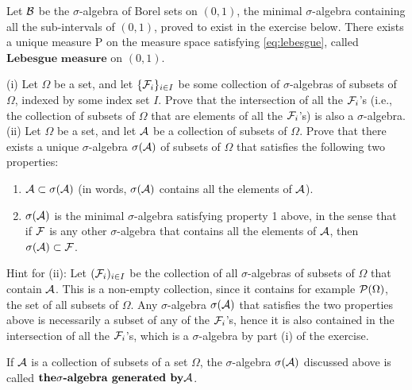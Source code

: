 \begin{thm}
\label{thm-lebesgue}
Let ${\cal B}$ be the $\sigma$-algebra of Borel sets
on $(0,1)$, the minimal $\sigma$-algebra containing
all the sub-intervals of $(0,1)$, proved to exist in
the exercise below. There exists a unique measure
$\mathrm{P}$ on the measure space satisfying
\eqref{eq:lebesgue}, called $\textbf{Lebesgue measure}$
on $(0,1)$.
\end{thm}

\begin{xexercise}
(i) Let $\Omega$ be a set, and let
$\{{\cal F}_i\}_{i\in I}$ be some collection of
$\sigma$-algebras of subsets of $\Omega$, indexed by
some index set $I$. Prove that the intersection of
all the ${\cal F}_i$'s (i.e., the collection of
subsets of $\Omega$ that are elements of all the
${\cal F}_i$'s) is also a $\sigma$-algebra. \\ (ii)
Let $\Omega$ be a set, and let ${\cal A}$ be a
collection of subsets of $\Omega$. Prove that there
exists a unique $\sigma$-algebra $\sigma({\cal A})$
of subsets of $\Omega$ that satisfies the following
two properties:

\begin{enumerate}[label=\arabic*.]
\item ${\cal A} \subset \sigma({\cal A})$ (in words,
$\sigma({\cal A})$ contains all the elements of
${\cal A}$).

\item $\sigma({\cal A})$ is the minimal $\sigma$-algebra
satisfying property 1 above, in the sense that if
${\cal F}$ is any other $\sigma$-algebra that
contains all the elements of ${\cal A}$, then
$\sigma({\cal A}) \subset {\cal F}$.
\end{enumerate}

\noindent Hint for (ii): Let $({\cal F}_i)_{i\in I}$ be the
collection of all $\sigma$-algebras of subsets of
$\Omega$ that contain ${\cal A}$. This is a non-empty
collection, since it contains for example
${\cal P}(\Omega)$, the set of all subsets of
$\Omega$. Any $\sigma$-algebra $\sigma({\cal A})$
that satisfies the two properties above is necessarily
a subset of any of the ${\cal F}_i$'s, hence it is
also contained in the intersection of all the
${\cal F}_i$'s, which is a $\sigma$-algebra by part
(i) of the exercise.
\end{xexercise}

\begin{defn}
If ${\cal A}$ is a collection of subsets of a set
$\Omega$, the $\sigma$-algebra $\sigma({\cal A})$
discussed above is called $\textbf{the$\sigma
$-algebra generated by${\cal A}$}$.
\end{defn}

